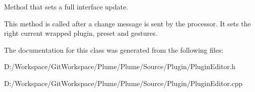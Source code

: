 Method that sets a full interface update. 

This method is called after a change message is sent by the processor. It sets the right current wrapped plugin, preset and gestures. 

The documentation for this class was generated from the following files\+:\begin{DoxyCompactItemize}
\item 
D\+:/\+Workspace/\+Git\+Workspace/\+Plume/\+Plume/\+Source/\+Plugin/Plugin\+Editor.\+h\item 
D\+:/\+Workspace/\+Git\+Workspace/\+Plume/\+Plume/\+Source/\+Plugin/Plugin\+Editor.\+cpp\end{DoxyCompactItemize}
